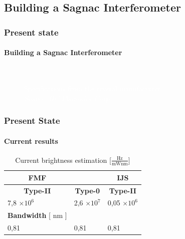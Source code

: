 \documentclass[serif,8pt]{beamer}
\begin{document}
\subsection{Building a Sagnac Interferometer}

\begin{frame}[t]
	\frametitle{Present state}
	\framesubtitle{Building a Sagnac Interferometer}
	\begin{figure}[!ht]
	  \centering
	  \pause
	  \\
	  \caption{\textcolor{white}{Specifications from the crystal manufacturer.\\\textit{Source: HC Photonics Corp.}}}
	\end{figure}
\end{frame}


\usebackgroundtemplate{}

\begin{frame}
	\frametitle{Present State}
	\framesubtitle{Current results}
	\begin{table}
		\begin{center}
			\caption{Current brightness estimation [$\frac{\text{Hz}}{\text{mWnm}}$]}
			\begin{tabular}[c|c|c]{|ll|l|}
				\hline
				\multicolumn{1}{|c}{\hfill\textbf{FMF}\hfill} &&
				\multicolumn{1}{c|}{\textbf{IJS}} \\
				\hline
				\multicolumn{1}{|c|}{\textbf{Type-II}} &
				\multicolumn{1}{c|}{\textbf{Type-0}} &
				\multicolumn{1}{c|}{\textbf{Type-II}} \\
				\hline
				7,8 $\times10^6$ & 2,6 $\times 10^7 $ & 0,05 $\times 10^6$ \\
				\hline
				\multicolumn{1}{|c}{\textbf{Bandwidth} [ nm ]} &\multicolumn{1}{c}{ } & \multicolumn{1}{c|}{ }  \\
				\hline
				0,81 & 0,81 & 0,81\\
				\hline
			\end{tabular}
		\end{center}
	\end{table}
\end{frame}
\end{document}
